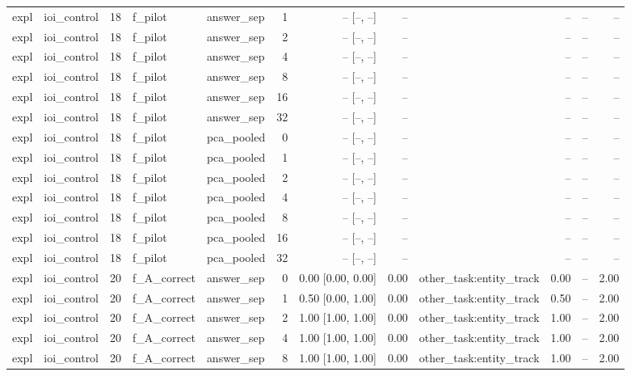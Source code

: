 \begin{tabular}{llrllrrrlrrr}
expl & ioi\_control & 18 & f\_pilot & answer\_sep & 1 & -- [--, --] & -- &  & -- & -- & -- \\
expl & ioi\_control & 18 & f\_pilot & answer\_sep & 2 & -- [--, --] & -- &  & -- & -- & -- \\
expl & ioi\_control & 18 & f\_pilot & answer\_sep & 4 & -- [--, --] & -- &  & -- & -- & -- \\
expl & ioi\_control & 18 & f\_pilot & answer\_sep & 8 & -- [--, --] & -- &  & -- & -- & -- \\
expl & ioi\_control & 18 & f\_pilot & answer\_sep & 16 & -- [--, --] & -- &  & -- & -- & -- \\
expl & ioi\_control & 18 & f\_pilot & answer\_sep & 32 & -- [--, --] & -- &  & -- & -- & -- \\
expl & ioi\_control & 18 & f\_pilot & pca\_pooled & 0 & -- [--, --] & -- &  & -- & -- & -- \\
expl & ioi\_control & 18 & f\_pilot & pca\_pooled & 1 & -- [--, --] & -- &  & -- & -- & -- \\
expl & ioi\_control & 18 & f\_pilot & pca\_pooled & 2 & -- [--, --] & -- &  & -- & -- & -- \\
expl & ioi\_control & 18 & f\_pilot & pca\_pooled & 4 & -- [--, --] & -- &  & -- & -- & -- \\
expl & ioi\_control & 18 & f\_pilot & pca\_pooled & 8 & -- [--, --] & -- &  & -- & -- & -- \\
expl & ioi\_control & 18 & f\_pilot & pca\_pooled & 16 & -- [--, --] & -- &  & -- & -- & -- \\
expl & ioi\_control & 18 & f\_pilot & pca\_pooled & 32 & -- [--, --] & -- &  & -- & -- & -- \\
expl & ioi\_control & 20 & f\_A\_correct & answer\_sep & 0 & 0.00 [0.00, 0.00] & 0.00 & other\_task:entity\_track & 0.00 & -- & 2.00 \\
expl & ioi\_control & 20 & f\_A\_correct & answer\_sep & 1 & 0.50 [0.00, 1.00] & 0.00 & other\_task:entity\_track & 0.50 & -- & 2.00 \\
expl & ioi\_control & 20 & f\_A\_correct & answer\_sep & 2 & 1.00 [1.00, 1.00] & 0.00 & other\_task:entity\_track & 1.00 & -- & 2.00 \\
expl & ioi\_control & 20 & f\_A\_correct & answer\_sep & 4 & 1.00 [1.00, 1.00] & 0.00 & other\_task:entity\_track & 1.00 & -- & 2.00 \\
expl & ioi\_control & 20 & f\_A\_correct & answer\_sep & 8 & 1.00 [1.00, 1.00] & 0.00 & other\_task:entity\_track & 1.00 & -- & 2.00 \\

\end{tabular}

